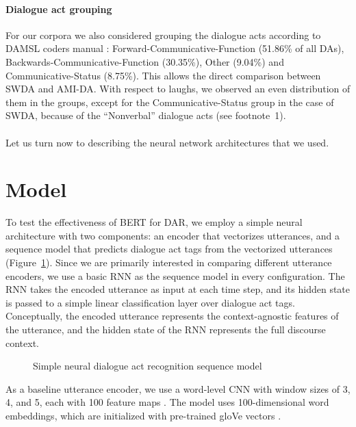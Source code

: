 \documentclass[11pt,a4paper]{article}
\begin{document}
\paragraph{Dialogue act grouping}
For our corpora we also considered grouping the dialogue acts according to DAMSL coders manual \citep{jurafskySwitchboardSWBDDAMSLShallowDiscourseFunction1997a}: Forward-Communicative-Function (51.86\% of all DAs), Backwards-Communicative-Function (30.35\%), Other (9.04\%) and Communicative-Status (8.75\%).
This allows the direct comparison between SWDA and AMI-DA.
With respect to laughs, we observed an even distribution of them in the groups, except for the Communicative-Status group in the case of SWDA, because of the ``Nonverbal'' dialogue acts (see footnote~1).

\paragraph{}
Let us turn now to describing the neural network architectures that we used.
  
\section{Model} %

To test the effectiveness of BERT for DAR, we employ a simple neural architecture with two components: an encoder that vectorizes utterances, and a sequence model that predicts dialogue act tags from the vectorized utterances (Figure~\ref{fig:model-architecture}).
Since we are primarily interested in comparing different utterance encoders, we use a basic RNN as the sequence model in every configuration. 
The RNN takes the encoded utterance as input at each time step,
and its hidden state is passed to a simple linear classification layer over dialogue act tags.
Conceptually, the encoded utterance represents the context-agnostic features of the utterance, and the hidden state of the RNN represents the full discourse context.

\begin{figure}
  
  \caption{Simple neural dialogue act recognition sequence model}
  \label{fig:model-architecture}
\end{figure}

As a baseline utterance encoder, we use a word-level CNN with window sizes of 3, 4, and 5, each with 100 feature maps \citep{kimConvolutionalNeuralNetworks2014}. 
The model uses 100-dimensional word embeddings, which are initialized with pre-trained gloVe vectors \citep{penningtonGloveGlobalVectors2014}.
\end{document}
